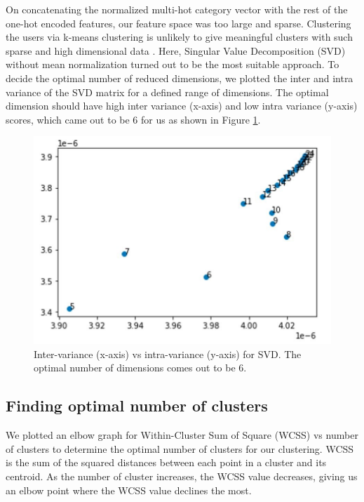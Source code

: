 On concatenating the normalized multi-hot category vector with the rest of the one-hot encoded features, our feature space was too large and sparse. Clustering the users via k-means clustering is unlikely to give meaningful clusters with such sparse and high dimensional data \cite{nur2015combination}. Here, Singular Value Decomposition (SVD) without mean normalization turned out to be the most suitable approach. To decide the optimal number of reduced dimensions, we plotted the inter and intra variance of the SVD matrix for a defined range of dimensions. The optimal dimension should have high inter variance (x-axis) and low intra variance (y-axis) scores, which came out to be 6 for us as shown in Figure \ref{fig:svd}.

\begin{figure}
  \centering
  \includegraphics[width=\linewidth]{figures/svd_inter_intra.jpeg}
  \caption[Plot of inter-variance vs intra-variance]{Inter-variance (x-axis) vs intra-variance (y-axis) for SVD. The optimal number of dimensions comes out to be 6.}
  \label{fig:svd}
\end{figure}



\subsection{Finding optimal number of clusters}

We plotted an elbow graph for Within-Cluster Sum of Square (WCSS) \cite{bagirov2008modified} vs number of clusters to determine the optimal number of clusters for our clustering. WCSS is the sum of the squared distances between each point in a cluster and its centroid. As the number of cluster increases, the WCSS value decreases, giving us an elbow point where the WCSS value declines the most.  

